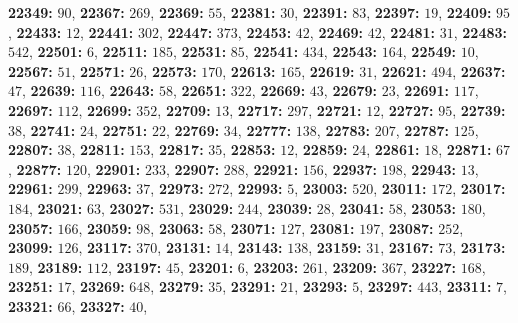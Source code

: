 \textsf{\bfseries 22349:} $90$, \textsf{\bfseries 22367:} $269$, \textsf{\bfseries 22369:} $55$, \textsf{\bfseries 22381:} $30$, \textsf{\bfseries 22391:} $83$, \textsf{\bfseries 22397:} $19$, \textsf{\bfseries 22409:} $95$, \textsf{\bfseries 22433:} $12$, \textsf{\bfseries 22441:} $302$, \textsf{\bfseries 22447:} $373$, \textsf{\bfseries 22453:} $42$, \textsf{\bfseries 22469:} $42$, \textsf{\bfseries 22481:} $31$, \textsf{\bfseries 22483:} $542$, \textsf{\bfseries 22501:} $6$, \textsf{\bfseries 22511:} $185$, \textsf{\bfseries 22531:} $85$, \textsf{\bfseries 22541:} $434$, \textsf{\bfseries 22543:} $164$, \textsf{\bfseries 22549:} $10$, \textsf{\bfseries 22567:} $51$, \textsf{\bfseries 22571:} $26$, \textsf{\bfseries 22573:} $170$, \textsf{\bfseries 22613:} $165$, \textsf{\bfseries 22619:} $31$, \textsf{\bfseries 22621:} $494$, \textsf{\bfseries 22637:} $47$, \textsf{\bfseries 22639:} $116$, \textsf{\bfseries 22643:} $58$, \textsf{\bfseries 22651:} $322$, \textsf{\bfseries 22669:} $43$, \textsf{\bfseries 22679:} $23$, \textsf{\bfseries 22691:} $117$, \textsf{\bfseries 22697:} $112$, \textsf{\bfseries 22699:} $352$, \textsf{\bfseries 22709:} $13$, \textsf{\bfseries 22717:} $297$, \textsf{\bfseries 22721:} $12$, \textsf{\bfseries 22727:} $95$, \textsf{\bfseries 22739:} $38$, \textsf{\bfseries 22741:} $24$, \textsf{\bfseries 22751:} $22$, \textsf{\bfseries 22769:} $34$, \textsf{\bfseries 22777:} $138$, \textsf{\bfseries 22783:} $207$, \textsf{\bfseries 22787:} $125$, \textsf{\bfseries 22807:} $38$, \textsf{\bfseries 22811:} $153$, \textsf{\bfseries 22817:} $35$, \textsf{\bfseries 22853:} $12$, \textsf{\bfseries 22859:} $24$, \textsf{\bfseries 22861:} $18$, \textsf{\bfseries 22871:} $67$, \textsf{\bfseries 22877:} $120$, \textsf{\bfseries 22901:} $233$, \textsf{\bfseries 22907:} $288$, \textsf{\bfseries 22921:} $156$, \textsf{\bfseries 22937:} $198$, \textsf{\bfseries 22943:} $13$, \textsf{\bfseries 22961:} $299$, \textsf{\bfseries 22963:} $37$, \textsf{\bfseries 22973:} $272$, \textsf{\bfseries 22993:} $5$, \textsf{\bfseries 23003:} $520$, \textsf{\bfseries 23011:} $172$, \textsf{\bfseries 23017:} $184$, \textsf{\bfseries 23021:} $63$, \textsf{\bfseries 23027:} $531$, \textsf{\bfseries 23029:} $244$, \textsf{\bfseries 23039:} $28$, \textsf{\bfseries 23041:} $58$, \textsf{\bfseries 23053:} $180$, \textsf{\bfseries 23057:} $166$, \textsf{\bfseries 23059:} $98$, \textsf{\bfseries 23063:} $58$, \textsf{\bfseries 23071:} $127$, \textsf{\bfseries 23081:} $197$, \textsf{\bfseries 23087:} $252$, \textsf{\bfseries 23099:} $126$, \textsf{\bfseries 23117:} $370$, \textsf{\bfseries 23131:} $14$, \textsf{\bfseries 23143:} $138$, \textsf{\bfseries 23159:} $31$, \textsf{\bfseries 23167:} $73$, \textsf{\bfseries 23173:} $189$, \textsf{\bfseries 23189:} $112$, \textsf{\bfseries 23197:} $45$, \textsf{\bfseries 23201:} $6$, \textsf{\bfseries 23203:} $261$, \textsf{\bfseries 23209:} $367$, \textsf{\bfseries 23227:} $168$, \textsf{\bfseries 23251:} $17$, \textsf{\bfseries 23269:} $648$, \textsf{\bfseries 23279:} $35$, \textsf{\bfseries 23291:} $21$, \textsf{\bfseries 23293:} $5$, \textsf{\bfseries 23297:} $443$, \textsf{\bfseries 23311:} $7$, \textsf{\bfseries 23321:} $66$, \textsf{\bfseries 23327:} $40$, 
